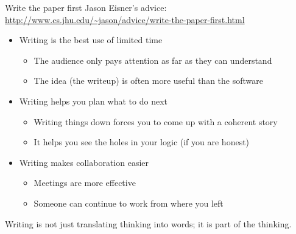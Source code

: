 \documentclass[usenames,dvipsnames,notes]{beamer}
\begin{document}
\begin{frame}
    {Write the paper first}
    Jason Eisner's advice: \url{http://www.cs.jhu.edu/~jason/advice/write-the-paper-first.html}
    \begin{itemize}
        \item Writing is the best use of limited time
            \begin{itemize}
                \item The audience only pays attention as far as they can understand
                \item The idea (the writeup) is often more useful than the software
            \end{itemize}
        \item Writing helps you plan what to do next 
            \begin{itemize}
                \item Writing things down forces you to come up with a coherent story 
                \item It helps you see the holes in your logic (if you are honest)  
            \end{itemize}
        \item Writing makes collaboration easier
            \begin{itemize}
                \item Meetings are more effective
                \item Someone can continue to work from where you left 
            \end{itemize}
    \end{itemize}
    Writing is not just translating thinking into words; it is part of the thinking.
\end{frame}
\end{document}
